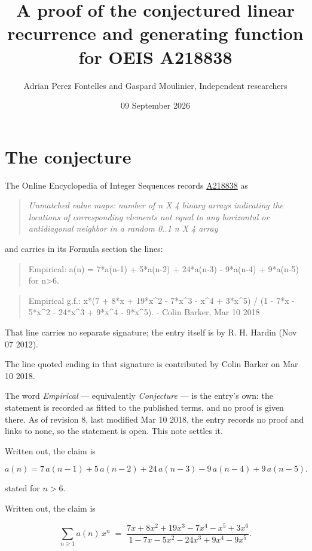 \documentclass[11pt]{article}
\title{A proof of the conjectured linear recurrence and generating function for OEIS A218838}
\author{Adrian Perez Fontelles and Gaspard Moulinier, Independent researchers}
\date{09 September 2026}
\theoremstyle{definition}
\begin{document}
\maketitle
\section{The conjecture}

The Online Encyclopedia of Integer Sequences records \href{https://oeis.org/A218838}{A218838} as

\begin{quote}\itshape Unmatched value maps: number of n X 4 binary arrays indicating the locations of corresponding elements not equal to any horizontal or antidiagonal neighbor in a random 0..1 n X 4 array\end{quote}

and carries in its Formula section the lines:

\begin{quote}\ttfamily Empirical: a(n) = 7*a(n-1) + 5*a(n-2) + 24*a(n-3) - 9*a(n-4) + 9*a(n-5) for n>6.\end{quote}

\begin{quote}\ttfamily Empirical g.f.: x*(7 + 8*x + 19*x\textasciicircum{}2 - 7*x\textasciicircum{}3 - x\textasciicircum{}4 + 3*x\textasciicircum{}5) / (1 - 7*x - 5*x\textasciicircum{}2 - 24*x\textasciicircum{}3 + 9*x\textasciicircum{}4 - 9*x\textasciicircum{}5). - Colin Barker, Mar 10 2018\end{quote}

That line carries no separate signature; the entry itself is by R. H. Hardin (Nov 07 2012).

The line quoted ending in that signature is contributed by Colin Barker on Mar 10 2018.

The word {\itshape Empirical} --- equivalently {\itshape Conjecture} --- is the entry's own: the statement is recorded as fitted to the published terms, and no proof is given there. As of revision 8, last modified Mar 10 2018, the entry records no proof and links to none, so the statement is open. This note settles it.

Written out, the claim is

\[a(n) = 7\,a(n-1) + 5\,a(n-2) + 24\,a(n-3) - 9\,a(n-4) + 9\,a(n-5).\]

stated for $n > 6$.

Written out, the claim is

\[\sum_{n \ge 1} a(n)\,x^n \;=\; \frac{7x + 8x^{2} + 19x^{3} - 7x^{4} - x^{5} + 3x^{6}}{1 - 7x - 5x^{2} - 24x^{3} + 9x^{4} - 9x^{5}}.\]
\end{document}
